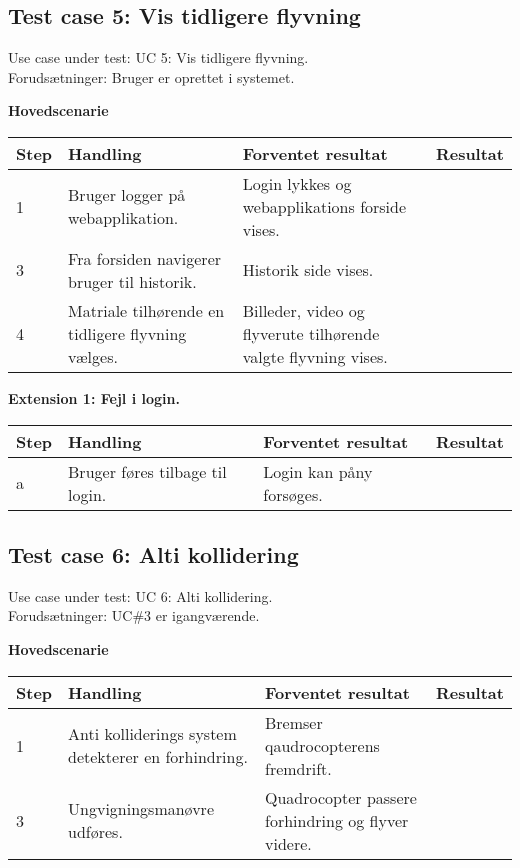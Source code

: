\newpage
\subsection*{Test case 5: Vis tidligere flyvning}
Use case under test: UC 5: Vis tidligere flyvning.\\
Forudsætninger:	Bruger er oprettet i systemet.

\textbf{Hovedscenarie}
\begin{table}[H]
	\centering
		\begin{tabular}{|l|p{5 cm}|p{5 cm}|p{3.5 cm}|} 
		\hline
			Step & Handling & Forventet resultat & Resultat\\ \hline
			1 & Bruger logger på webapplikation. & Login lykkes og webapplikations forside vises. &  \\ \hline
			3 & Fra forsiden navigerer bruger til historik. & Historik side vises. & \\ \hline
			4 & Matriale tilhørende en tidligere flyvning vælges. & Billeder, video og flyverute tilhørende valgte flyvning vises. & \\ \hline			
		\end{tabular}
\end{table}

\textbf{Extension 1: Fejl i login.}
\begin{table}[H]
	\centering
		\begin{tabular}{|l|p{5 cm}|p{5 cm}|p{3.5 cm}|} 
		\hline
			Step & Handling & Forventet resultat & Resultat\\ \hline
			a & Bruger føres tilbage til login. & Login kan påny forsøges. & \\ \hline
		\end{tabular}
\end{table}

\subsection*{Test case 6: Alti kollidering}
Use case under test: UC 6: Alti kollidering.\\
Forudsætninger:	UC\#3 er igangværende.

\textbf{Hovedscenarie}
\begin{table}[H]
	\centering
		\begin{tabular}{|l|p{5 cm}|p{5 cm}|p{3.5 cm}|} 
		\hline
			Step & Handling & Forventet resultat & Resultat\\ \hline
			1 & Anti kolliderings system detekterer en forhindring. & Bremser qaudrocopterens fremdrift. &  \\ \hline
			3 & Ungvigningsmanøvre udføres. & Quadrocopter passere forhindring og flyver videre. & \\ \hline			
		\end{tabular}
\end{table}

